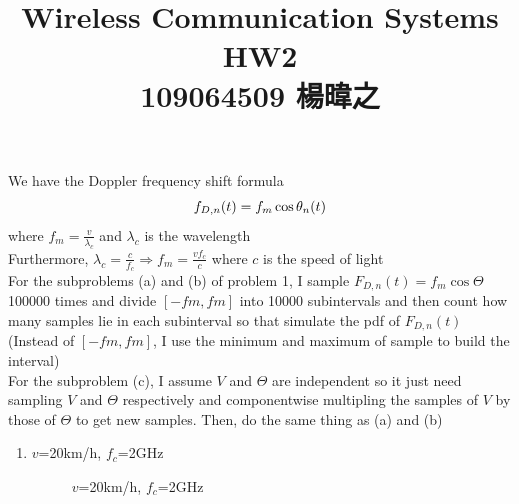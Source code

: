 \documentclass{article}
\title{Wireless Communication Systems  HW2\\109064509 楊暐之}
\date{}
\begin{document}
\maketitle
\begin{flushleft}
We have the Doppler frequency shift formula
\begin{equation}
f_{D,n}(t)=f_m\cos\theta_n(t) \notag
\end{equation}
where $f_m=\frac{v}{\lambda_c}$ and $\lambda_c$ is the wavelength\\
Furthermore, $\lambda_c=\frac{c}{f_c}\Rightarrow f_m=\frac{vf_c}{c}$ where $c$ is the speed of light\\[0.2cm]
For the subproblems (a) and (b) of problem 1, I sample $F_{D,n}(t)=f_m\cos\Theta$ 100000 times and divide $[-fm,fm]$ into 10000 subintervals and then count how many samples lie in each subinterval so that simulate the pdf of $F_{D,n}(t)$\\
(Instead of $[-fm,fm]$, I use the minimum and maximum of sample to build the interval)\\[0.2cm]
For the subproblem (c), I assume $V$ and $\Theta$ are independent so it just need sampling $V$ and $\Theta$ respectively and componentwise multipling the samples of $V$ by those of $\Theta$ to get new samples. Then, do the same thing as (a) and (b)

\newpage

\begin{enumerate}[label=(\alph*)]
\item
 $v$=20km/h, $f_c$=2GHz
\begin{figure}[H]
\centering
{}
\caption{ $v$=20km/h, $f_c$=2GHz}
\end{figure}


\end{enumerate}
\end{flushleft}
\end{document}

